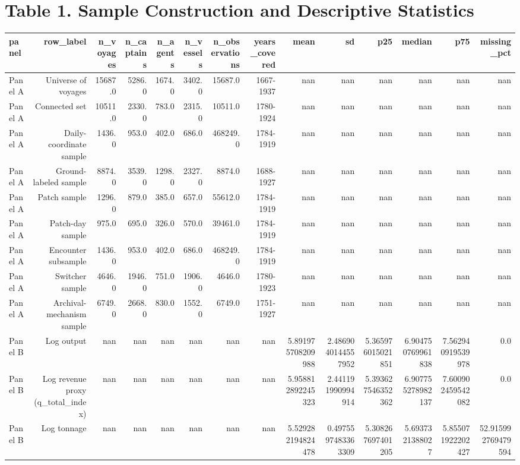 \documentclass{article}
\begin{document}
\section*{Table 1. Sample Construction and Descriptive Statistics}
\begin{tabular}{lrrrrrrrrrrrrr}
\hline
panel & row_label & n_voyages & n_captains & n_agents & n_vessels & n_observations & years_covered & mean & sd & p25 & median & p75 & missing_pct \\
\hline
Panel A & Universe of voyages & 15687.0 & 5286.0 & 1674.0 & 3402.0 & 15687.0 & 1667-1937 & nan & nan & nan & nan & nan & nan \\
Panel A & Connected set & 10511.0 & 2330.0 & 783.0 & 2315.0 & 10511.0 & 1780-1924 & nan & nan & nan & nan & nan & nan \\
Panel A & Daily-coordinate sample & 1436.0 & 953.0 & 402.0 & 686.0 & 468249.0 & 1784-1919 & nan & nan & nan & nan & nan & nan \\
Panel A & Ground-labeled sample & 8874.0 & 3539.0 & 1298.0 & 2327.0 & 8874.0 & 1688-1927 & nan & nan & nan & nan & nan & nan \\
Panel A & Patch sample & 1296.0 & 879.0 & 385.0 & 657.0 & 55612.0 & 1784-1919 & nan & nan & nan & nan & nan & nan \\
Panel A & Patch-day sample & 975.0 & 695.0 & 326.0 & 570.0 & 39461.0 & 1784-1919 & nan & nan & nan & nan & nan & nan \\
Panel A & Encounter subsample & 1436.0 & 953.0 & 402.0 & 686.0 & 468249.0 & 1784-1919 & nan & nan & nan & nan & nan & nan \\
Panel A & Switcher sample & 4646.0 & 1946.0 & 751.0 & 1906.0 & 4646.0 & 1780-1923 & nan & nan & nan & nan & nan & nan \\
Panel A & Archival-mechanism sample & 6749.0 & 2668.0 & 830.0 & 1552.0 & 6749.0 & 1751-1927 & nan & nan & nan & nan & nan & nan \\
Panel B & Log output & nan & nan & nan & nan & nan & nan & 5.891975708209988 & 2.4869040144557952 & 5.365976015021851 & 6.904750769961838 & 7.562940919539978 & 0.0 \\
Panel B & Log revenue proxy (q\_total\_index) & nan & nan & nan & nan & nan & nan & 5.958812892245323 & 2.441191990994914 & 5.393627546352362 & 6.907755278982137 & 7.600902459542082 & 0.0 \\
Panel B & Log tonnage & nan & nan & nan & nan & nan & nan & 5.529282194824478 & 0.4975597483363309 & 5.308267697401205 & 5.6937321388027 & 5.855071922202427 & 52.915992769479594 \\

\end{tabular}
\end{document}
